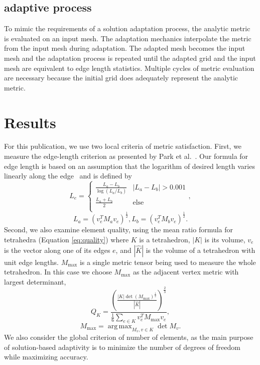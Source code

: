 \documentclass[3p,times,procedia,number]{elsarticle}
\DeclareMathOperator*{\argmax}{arg\,max}
\begin{document}
\subsection{adaptive process}

To mimic the requirements of a solution adaptation process,
the analytic metric is evaluated on an input mesh.
The adaptation mechanics interpolate the metric from the input
mesh during adaptation.
The adapted mesh becomes the input mesh and the adaptation process is repeated
until the adapted grid and the input mesh are equivalent to edge
length statistics.
Multiple cycles of metric evaluation are necessary because the
initial grid does adequately represent the analytic metric.

\section{Results}
\label{sec:results}

For this publication, we use two local criteria of metric satisfaction.
First, we measure the edge-length criterion as presented
by Park et al.~\cite{park-loseille-krakos-michal-adapt-decomposition}.
Our formula for edge length is based on an assumption
that the logarithm of desired length varies linearly along the
edge~\cite{alauzet-fead-2010-size-gradation-aniso} and is defined
by
\begin{equation}
\label{eq:length}
L_e = \begin{cases}
\frac{L_a - L_b}{\log(L_a / L_b)} & |L_a - L_b| > 0.001 \\
\frac{L_a + L_b}{2} & \text{else} \\
\end{cases}
,
\end{equation}
\begin{equation}
\label{eq:endpoint_lengths}
L_a = (v_e^T M_a v_e)^{\frac12},
L_b = (v_e^T M_b v_e)^{\frac12}
.
\end{equation}
Second, we also examine element quality, using the
mean ratio formula for tetrahedra (Equation \ref{eq:quality})
where $K$ is a tetrahedron, $|K|$ is its volume,
$v_e$ is the vector along one of its edges $e$,
and $|\hat{K}|$ is the volume of a tetrahedron
with unit edge lengths.
$M_{\text{max}}$ is a single metric tensor
being used to measure the whole tetrahedron.
In this case we choose $M_{\text{max}}$ as the
adjacent vertex metric with largest determinant,
\begin{equation}
\label{eq:quality}
Q_K =
 \frac{\left(\frac{|K|\det(M_{\text{max}})^{\frac12}}
                  {|\hat{K}|}
       \right)^{\frac{2}{3}}}
      {\frac16\sum_{e\in K}{v_e^T M_{\text{max}} v_e}}
      ,
\end{equation}
\begin{equation}
\label{eq:max_metric}
M_{\text{max}} = \argmax_{M_v, v\in K}{\det{M_v}}
.
\end{equation}
We also consider the global criterion of number of elements,
as the main purpose of solution-based adaptivity is to
minimize the number of degrees of freedom while maximizing
accuracy.
\end{document}

